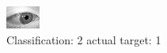 \begin{figure}[h!]
\begin{center}
\includegraphics[width=0.60\columnwidth]{figures/ID2768_class_2_target_1.png}
\end{center}
\caption{ Classification: 2 actual target: 1}
\label{fig:ID2768_class_2_target_1}
\end{figure}
